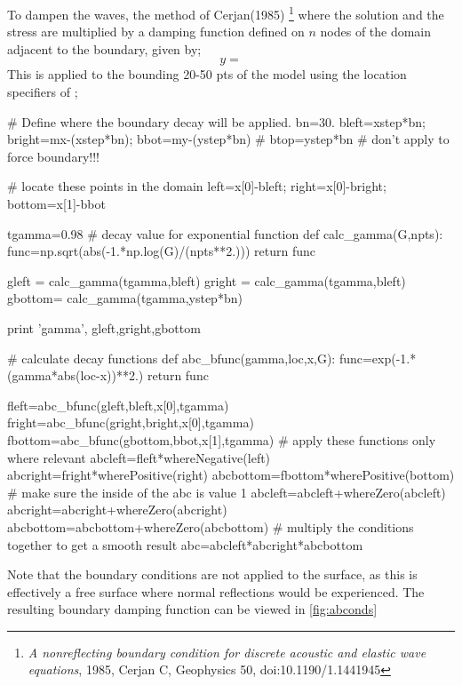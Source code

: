 To dampen the waves, the method of Cerjan(1985)
\footnote{\textit{A nonreflecting boundary condition for discrete acoustic and
elastic wave equations}, 1985, Cerjan C, Geophysics 50, doi:10.1190/1.1441945}
where the solution and the stress are multiplied by a damping function defined
on $n$ nodes of the domain adjacent to the boundary, given by;
\begin{equation}
 y=
\end{equation}
This is applied to the bounding 20-50 pts of the model using the location
specifiers of \esc;
\begin{python}
# Define where the boundary decay will be applied.
bn=30.
bleft=xstep*bn; bright=mx-(xstep*bn); bbot=my-(ystep*bn)
# btop=ystep*bn # don't apply to force boundary!!!

# locate these points in the domain
left=x[0]-bleft; right=x[0]-bright; bottom=x[1]-bbot

tgamma=0.98   # decay value for exponential function
def calc_gamma(G,npts):
    func=np.sqrt(abs(-1.*np.log(G)/(npts**2.)))
    return func

gleft  = calc_gamma(tgamma,bleft)
gright = calc_gamma(tgamma,bleft)
gbottom= calc_gamma(tgamma,ystep*bn)

print 'gamma', gleft,gright,gbottom

# calculate decay functions
def abc_bfunc(gamma,loc,x,G):
    func=exp(-1.*(gamma*abs(loc-x))**2.)
    return func

fleft=abc_bfunc(gleft,bleft,x[0],tgamma)
fright=abc_bfunc(gright,bright,x[0],tgamma)
fbottom=abc_bfunc(gbottom,bbot,x[1],tgamma)
# apply these functions only where relevant
abcleft=fleft*whereNegative(left)
abcright=fright*wherePositive(right)
abcbottom=fbottom*wherePositive(bottom)
# make sure the inside of the abc is value 1
abcleft=abcleft+whereZero(abcleft)
abcright=abcright+whereZero(abcright)
abcbottom=abcbottom+whereZero(abcbottom)
# multiply the conditions together to get a smooth result
abc=abcleft*abcright*abcbottom
\end{python}
Note that the boundary conditions are not applied to the surface, as this is
effectively a free surface where normal reflections would be experienced. The
resulting boundary damping function can be viewed in \ref{fig:abconds}



